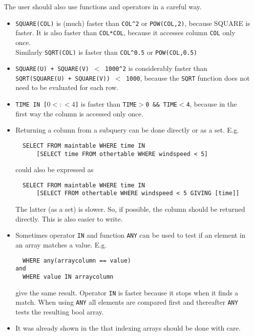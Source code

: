 The user should also use functions and operators in a careful way.
\begin{itemize}

\item
\texttt{SQUARE(COL)} is (much) faster than \texttt{COL}\verb+^+\texttt{2}
or \texttt{POW(COL,2)}, because SQUARE is faster.
It is also faster than \texttt{COL*COL}, because it accesses column
\texttt{COL} only once.
\\Similarly \texttt{SQRT(COL)} is faster than \texttt{COL}\verb+^+\texttt{0.5}
or \texttt{POW(COL,0.5)}

\item
\texttt{SQUARE(U) + SQUARE(V) $<$ 1000}\verb+^+\texttt{2} is considerably faster
than
\\\texttt{SQRT(SQUARE(U) + SQUARE(V)) $<$ 1000}, because the
\texttt{SQRT} function does not need to be evaluated for each row.

\item
\texttt{TIME IN [$0<:<4$]} is faster than
\texttt{TIME$>$0 \&\& TIME$<$4}, because in the first way the column is
accessed only once.

\item
Returning a column from a subquery can be done directly or as a
set. E.g.
\begin{verbatim}
  SELECT FROM maintable WHERE time IN
      [SELECT time FROM othertable WHERE windspeed < 5]
\end{verbatim}
could also be expressed as
\begin{verbatim}
  SELECT FROM maintable WHERE time IN
      [SELECT FROM othertable WHERE windspeed < 5 GIVING [time]]
\end{verbatim}
The latter (as a set) is slower. So, if possible, the column should
be returned directly. This is also easier to write.

\item
Sometimes operator \texttt{IN} and function \texttt{ANY} can be used to test
if an element in an array matches a value. E.g.
\begin{verbatim}
  WHERE any(arraycolumn == value)
and
  WHERE value IN arraycolumn
\end{verbatim}
give the same result.
Operator \texttt{IN} is faster because it stops when it finds a
match. When using \texttt{ANY} all elements are compared first and thereafter
\texttt{ANY} tests the resulting bool array.

\item
It was already shown in the 
that indexing arrays should be done with care.
\end{itemize}


